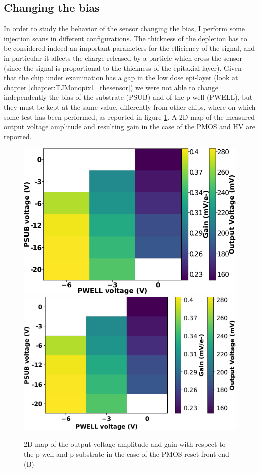     \subsection{Changing the bias}\label{chap:characterization_section:bias}
        In order to study the behavior of the sensor changing the bias, I perform some injection scans in different configurations. 
        The thickness of the depletion has to be considered indeed an important parameters for the efficiency of the signal, and in particular it affects the charge released by a particle which cross the sensor (since the signal is proportional to the thickness of the epitaxial layer).
        Given that the chip under examination has a gap in the low dose epi-layer (look at chapter \ref{chapter:TJMonopix1_thesensor}) we were not able to change independently the bias of the substrate (PSUB) and of the p-well (PWELL), but they must be kept at the same value, differently from other chips, where on which some test has been performed, as reported in figure \ref{fig:gain_vs_bias}.
        A 2D map of the measured output voltage amplitude and resulting gain in the case of the PMOS and HV are reported. 
        \begin{figure}[h!]
            \centering
            \includegraphics[width=.45\linewidth]{figures/Monopix1/PMOS_gain_bias.png}
            \includegraphics[width=.49\linewidth]{figures/Monopix1/HV_gain_bias.png}            
            \caption{2D map of the output voltage amplitude and gain with respect to the p-well and p-substrate in the case of the PMOS reset front-end (B)}
            \label{fig:gain_vs_bias}
        \end{figure}  

